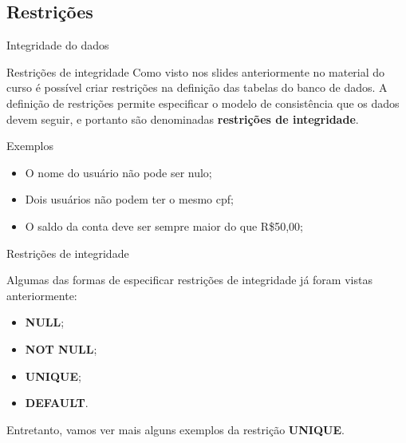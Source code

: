 \documentclass[xcolor=x11names,compress]{beamer}
\begin{document}
\subsection{Restrições}
\begin{frame}{Integridade do dados}

\begin{alertblock}{Restrições de integridade}
Como visto nos slides anteriormente no material do curso é possível criar restrições na definição das tabelas do banco de dados. A definição de restrições permite especificar o modelo de consistência que os dados devem seguir, e portanto são denominadas \textbf{restrições de integridade}.
\end{alertblock}

\begin{alertblock}{Exemplos}
\begin{itemize}
\itemsep 5mm

\item O nome do usuário não pode ser nulo;

\item Dois usuários não podem ter o mesmo cpf;

\item O saldo da conta deve ser sempre maior do que R\$50,00;

\end{itemize}
\end{alertblock}

\end{frame}

\begin{frame}{Restrições de integridade}

Algumas das formas de especificar restrições de integridade já foram vistas anteriormente:

\begin{itemize}
\itemsep 5mm

\item \textbf{NULL}; 

\item \textbf{NOT NULL};

\item \textbf{UNIQUE};

\item \textbf{DEFAULT}.

\end{itemize}

Entretanto, vamos ver mais alguns exemplos da restrição \textbf{UNIQUE}.

\end{frame}
\end{document}
